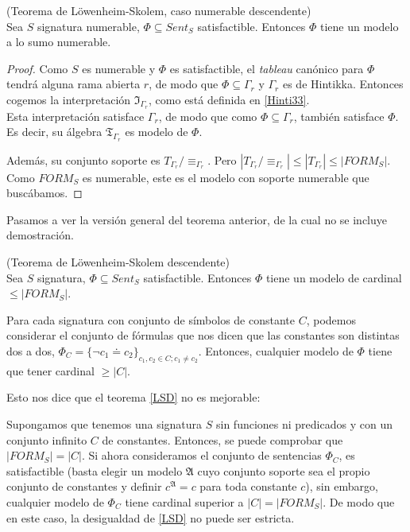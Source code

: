 \begin{theorem}
(Teorema de Löwenheim-Skolem, caso numerable descendente)\\
Sea $S$ signatura numerable, $\Phi\subseteq Sent_S$ satisfactible. Entonces $\Phi$ tiene un modelo a lo sumo numerable.
\end{theorem}
\begin{proof}
Como $S$ es numerable y $\Phi$ es satisfactible, el \textit{tableau} canónico para $\Phi$ tendrá alguna rama abierta $r$, de modo que $\Phi\subseteq\Gamma_r$ y $\Gamma_r$ es de Hintikka. Entonces cogemos la interpretación $\mathfrak{I}_{\Gamma_r}$, como está definida en \ref{Hinti33}.\\

Esta interpretación satisface $\Gamma_r$, de modo que como $\Phi\subseteq\Gamma_r$, también satisface $\Phi$. Es decir, su álgebra $\mathfrak{T}_{\Gamma_r}$ es modelo de $\Phi$.

Además, su conjunto soporte es $T_{\Gamma_r}/\equiv_{\Gamma_r}$. Pero $|T_{\Gamma_r}/\equiv_{\Gamma_r}|\leq|T_{\Gamma_r}|\leq|FORM_S|$. Como $FORM_S$ es numerable, este es el modelo con soporte numerable que buscábamos.
\end{proof}

Pasamos a ver la versión general del teorema anterior, de la cual no se incluye demostración.

\begin{theorem}\label{LSD} (Teorema de Löwenheim-Skolem descendente)\\
Sea $S$ signatura, $\Phi\subseteq Sent_S$ satisfactible. Entonces $\Phi$ tiene un modelo de cardinal $\leq|FORM_S|$.
\end{theorem}

\begin{note}
Para cada signatura con conjunto de símbolos de constante $C$, podemos considerar el conjunto de fórmulas que nos dicen que las constantes son distintas dos a dos, $\Phi_C=\{\neg c_1\doteq c_2\}_{c_1,c_2\in C;c_1\neq c_2}$. Entonces, cualquier modelo de $\Phi$ tiene que tener cardinal $\geq |C|$.

Esto nos dice que el teorema \ref{LSD} no es mejorable:

Supongamos que tenemos una signatura $S$ sin funciones ni predicados y con un conjunto infinito $C$ de constantes. Entonces, se puede comprobar que $|FORM_S|=|C|$. Si ahora consideramos el conjunto de sentencias $\Phi_C$, es satisfactible (basta elegir un modelo $\mathfrak{A}$ cuyo conjunto  soporte sea el propio conjunto de constantes y definir $c^\mathfrak{A}=c$ para toda constante $c$), sin embargo, cualquier  modelo de $\Phi_C$ tiene cardinal superior a $|C|=|FORM_S|$. De modo que en este caso, la desigualdad de \ref{LSD} no puede  ser  estricta.
\end{note}

